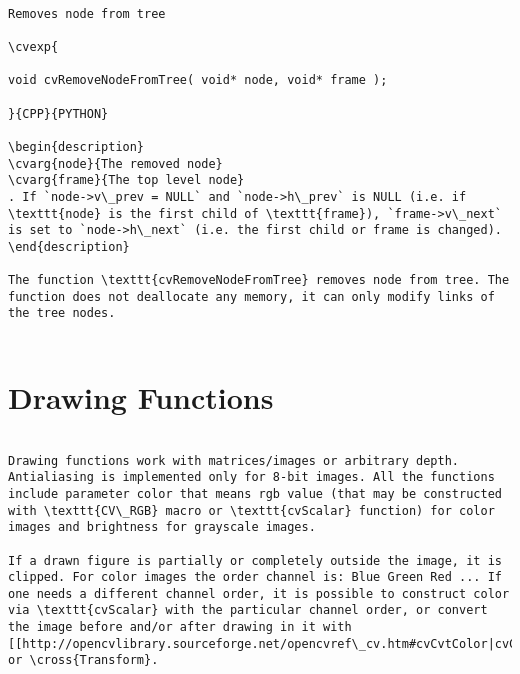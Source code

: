 \begin{verbatim}

Removes node from tree

\cvexp{

void cvRemoveNodeFromTree( void* node, void* frame );

}{CPP}{PYTHON}

\begin{description}
\cvarg{node}{The removed node}
\cvarg{frame}{The top level node}
. If `node->v\_prev = NULL` and `node->h\_prev` is NULL (i.e. if \texttt{node} is the first child of \texttt{frame}), `frame->v\_next` is set to `node->h\_next` (i.e. the first child or frame is changed).
\end{description}

The function \texttt{cvRemoveNodeFromTree} removes node from tree. The function does not deallocate any memory, it can only modify links of the tree nodes.


\end{verbatim}
\section{Drawing Functions}
\begin{verbatim}

Drawing functions work with matrices/images or arbitrary depth. Antialiasing is implemented only for 8-bit images. All the functions include parameter color that means rgb value (that may be constructed with \texttt{CV\_RGB} macro or \texttt{cvScalar} function) for color images and brightness for grayscale images.

If a drawn figure is partially or completely outside the image, it is clipped. For color images the order channel is: Blue Green Red ... If one needs a different channel order, it is possible to construct color via \texttt{cvScalar} with the particular channel order, or convert the image before and/or after drawing in it with [[http://opencvlibrary.sourceforge.net/opencvref\_cv.htm#cvCvtColor|cvCvtColor]] or \cross{Transform}.


\end{verbatim}
